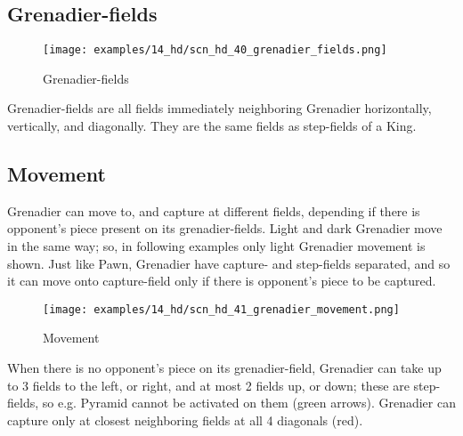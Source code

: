 \vspace*{-0.3\baselineskip}
\subsection*{Grenadier-fields}
\label{sec:Hemera's Dawn/Grenadier/Grenadier-fields}

\vspace*{-0.7\baselineskip}
\noindent
\begin{wrapfigure}[5]{l}{0.4\textwidth}
\centering
\texttt{[image: examples/14\_hd/scn\_hd\_40\_grenadier\_fields.png]}
\vspace*{-0.5\baselineskip}
\caption{Grenadier-fields}
\label{fig:scn_hd_40_grenadier_fields}
\end{wrapfigure}
Grenadier-fields are all fields immediately neighboring Grenadier horizontally,
vertically, and diagonally. They are the same fields as step-fields of a King.

\vspace*{2.3\baselineskip}
\subsection*{Movement}
\label{sec:Hemera's Dawn/Grenadier/Movement}

\vspace*{-0.7\baselineskip}
Grenadier can move to, and capture at different fields, depending if there is
opponent's piece present on its grenadier-fields. Light and dark Grenadier move
in the same way; so, in following examples only light Grenadier movement is
shown. \newline
\indent
Just like Pawn, Grenadier have capture- and step-fields separated, and so it
can move onto capture-field only if there is opponent's piece to be captured.

\clearpage %

\vspace*{-2.3\baselineskip}
\noindent
\begin{figure}[!h]
\texttt{[image: examples/14\_hd/scn\_hd\_41\_grenadier\_movement.png]}
\vspace*{-1.3\baselineskip}
\caption{Movement}
\label{fig:scn_hd_41_grenadier_movement}
\end{figure}

\vspace*{-0.5\baselineskip}
When there is no opponent's piece on its grenadier-field, Grenadier can take up to 3
fields to the left, or right, and at most 2 fields up, or down; these are step-fields,
so e.g. Pyramid cannot be activated on them (green arrows). Grenadier can capture only
at closest neighboring fields at all 4 diagonals (red).

